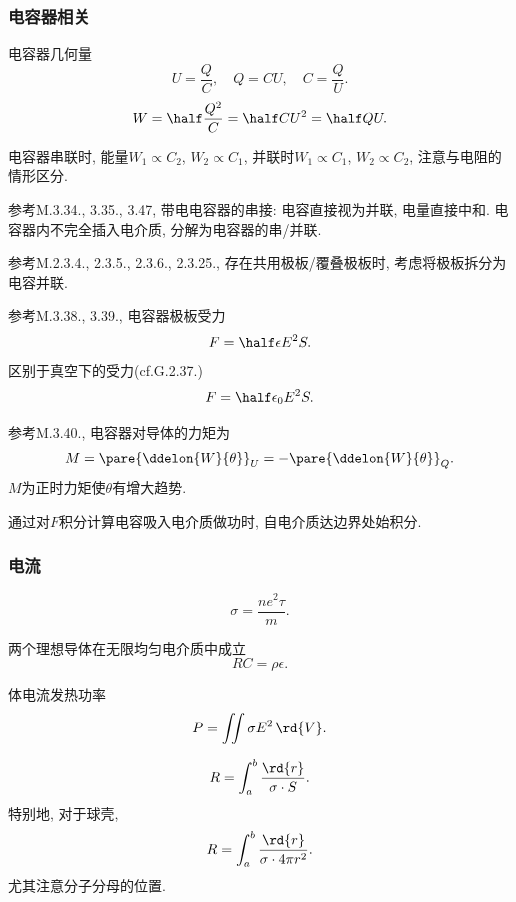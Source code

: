 \documentclass{ctexart}
\begin{document}

\subsubsection{电容器相关} %
\label{ssub:电容器相关}

\begin{finale}
	电容器几何量
	\[ U = \frac{Q}{C}, \quad Q = CU, \quad C = \frac{Q}{U}. \]
	\[ W = \half \frac{Q^2}{C} = \half CU^2 = \half QU. \]
\end{finale}
\begin{finale}
	电容器串联时, 能量$W_1\propto C_2$, $W_2\propto C_1$, 并联时$W_1\propto C_1$, $W_2\propto C_2$, 注意与电阻的情形区分.
\end{finale}
\begin{finale}
	参考M.3.34., 3.35., 3.47, 带电电容器的串接: 电容直接视为并联, 电量直接中和. 电容器内不完全插入电介质, 分解为电容器的串/并联.
\end{finale}
\begin{finale}
	参考M.2.3.4., 2.3.5., 2.3.6., 2.3.25., 存在共用极板/覆叠极板时, 考虑将极板拆分为电容并联.
\end{finale}
\begin{finale}
	参考M.3.38., 3.39., 电容器极板受力
	\[ F = \half \epsilon E^2 S. \]
	区别于真空下的受力(cf.G.2.37.)
	\[ F = \half \epsilon_0 E^2 S. \]
\end{finale}
\begin{finale}
	参考M.3.40., 电容器对导体的力矩为
	\[ M = \pare{\ddelon{W}{\theta}}_U = -\pare{\ddelon{W}{\theta}}_Q. \]
	$M$为正时力矩使$\theta$有增大趋势.
\end{finale}
\begin{finale}
	通过对$F$积分计算电容吸入电介质做功时, 自电介质达边界处始积分.
\end{finale}


\subsubsection{电流} %
\label{ssub:电流}

\begin{finale}
	\[ \sigma = \frac{ne^2\tau}{m}. \]
\end{finale}
\begin{finale}
	两个理想导体在无限均匀电介质中成立
	\[ RC = \rho\epsilon. \]
\end{finale}
\begin{finale}
	体电流发热功率
	\[ P = \iint \sigma E^2\,\rd{V}. \]
\end{finale}
\begin{pitfall}
	\[ R = \int_a^b \frac{\rd{r}}{\sigma \cdot S}. \]
	特别地, 对于球壳,
	\[ R = \int_a^b \frac{\rd{r}}{\sigma \cdot 4\pi r^2}. \]
	尤其注意分子分母的位置.
\end{pitfall}
\end{document}
